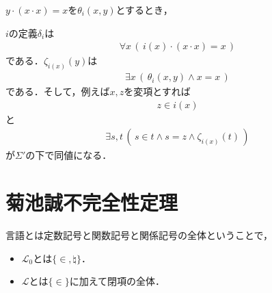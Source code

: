 	\begin{screen}
		$y \cdot (x \cdot x) = x$を$\theta_{i}(x,y)$とするとき，
	\end{screen}
	
	$i$の定義$\delta_{i}$は
	\begin{align}
		\forall x\, \left(\, i(x) \cdot (x \cdot x) = x\, \right)
	\end{align}
	である．$\zeta_{i(x)}(y)$は
	\begin{align}
		\exists x\, \left(\, \theta_{i}(x,y) \wedge x = x\, \right)
	\end{align}
	である．そして，例えば$x,z$を変項とすれば
	\begin{align}
		z \in i(x)
	\end{align}
	と
	\begin{align}
		\exists s,t\, \left(\, s \in t \wedge s = z \wedge \zeta_{i(x)}(t)\, \right)
	\end{align}
	が$\Sigma'$の下で同値になる．
	
\section{菊池誠不完全性定理}
	言語とは定数記号と関数記号と関係記号の全体ということで，
	\begin{itemize}
		\item $\mathcal{L}_{0}$とは$\{\in,\natural\}$．
		\item $\mathcal{L}$とは$\{\in\}$に加えて閉項の全体．
	\end{itemize}